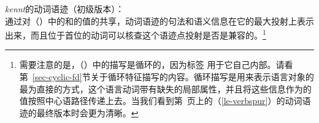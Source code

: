 \eas
\emph{kennt}的动词语迹（初级版本）：\\
\label{le-verbspur-kennt}%
\zs
\largerpage
通过对（）中的\localv 和\dsl 的值的共享，动词语迹的句法和语义信息在它的最大投射上表示出来，而且位于首位的动词可以核查这个语迹点投射是否是兼容的。\footnote{
需要注意的是，（）中的描写是循环的，因为标签 用于它自己内部。请看第~\ref{sec-cyclic-fd}节关于循环特征描写的内容。循环描写是用来表示语言对象的最为直接的方式，这个语言动词带有缺失的局部属性，并且将这些信息作为\dslf 的值按照中心语路径传递上去。当我们看到第~\pageref{le-verbspur}页上的（\ref{le-verbspur}）的动词语迹的最终版本时会更为清晰。
}

